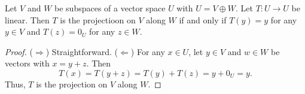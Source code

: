 \begin{theorem}
  Let $V$ and $W$ be subspaces of a vector space $U$ with $U = V \oplus W$.
  Let $T: U \to U$ be linear.
  Then $T$ is the projectioon on $V$ along $W$ if and only if $T(y) = y$ for
  any $y \in V$ and $T(z) = 0_U$ for any $z \in W$.
\end{theorem}
\begin{proof}
  ($\Rightarrow$) Straightforward.
  ($\Leftarrow$)
  For any $x \in U$, let $y \in V$ and $w \in W$ be vectors with $x = y + z$.
  Then
  \begin{equation*}
    T(x)
    = T(y + z)
    = T(y) + T(z)
    = y + 0_U
    = y.
  \end{equation*}
  Thus, $T$ is the projection on $V$ along $W$.
\end{proof}